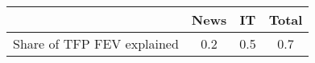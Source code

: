 \begin{small}
	\begin{tabular}{lccc}
	\hline
		& News & IT & Total \\
		\hline
		Share of TFP FEV explained & 0.2 & 0.5 & 0.7 \\
		\hline
	\end{tabular}
\end{small}

